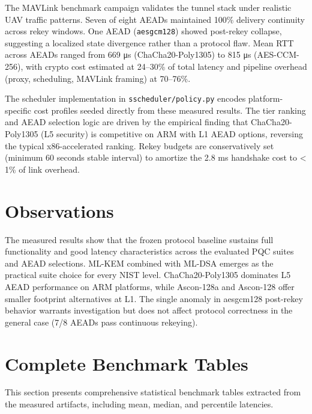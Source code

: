 \documentclass[conference]{IEEEtran}
\begin{document}
The MAVLink benchmark campaign validates the tunnel stack under realistic UAV traffic patterns. Seven of eight AEADs maintained 100\% delivery continuity across rekey windows. One AEAD (\texttt{aesgcm128}) showed post-rekey collapse, suggesting a localized state divergence rather than a protocol flaw. Mean RTT across AEADs ranged from 669 μs (ChaCha20-Poly1305) to 815 μs (AES-CCM-256), with crypto cost estimated at 24–30\% of total latency and pipeline overhead (proxy, scheduling, MAVLink framing) at 70–76\%.

The scheduler implementation in \texttt{sscheduler/policy.py} encodes platform-specific cost profiles seeded directly from these measured results. The tier ranking and AEAD selection logic are driven by the empirical finding that ChaCha20-Poly1305 (L5 security) is competitive on ARM with L1 AEAD options, reversing the typical x86-accelerated ranking. Rekey budgets are conservatively set (minimum 60 seconds stable interval) to amortize the 2.8 ms handshake cost to < 1\% of link overhead.

\section{Observations}
The measured results show that the frozen protocol baseline sustains full functionality and good latency characteristics across the evaluated PQC suites and AEAD selections. ML-KEM combined with ML-DSA emerges as the practical suite choice for every NIST level. ChaCha20-Poly1305 dominates L5 AEAD performance on ARM platforms, while Ascon-128a and Ascon-128 offer smaller footprint alternatives at L1. The single anomaly in aesgcm128 post-rekey behavior warrants investigation but does not affect protocol correctness in the general case (7/8 AEADs pass continuous rekeying).
\section{Complete Benchmark Tables}
This section presents comprehensive statistical benchmark tables extracted from the measured artifacts, including mean, median, and percentile latencies.
\end{document}
